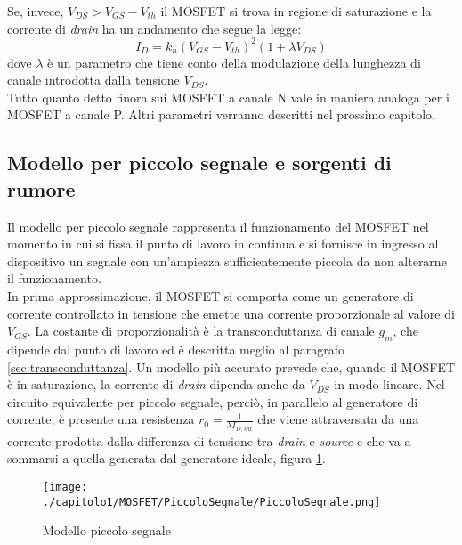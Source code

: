 Se, invece, $V_{DS} > V_{GS} -  V_{th}$ il MOSFET si trova in regione di saturazione e la corrente di \emph{drain} ha un andamento che segue la legge:\\
\begin{equation}
  I_D = k_n\left(V_{GS}-V_{th}\right)^2 (1+\lambda V_{DS})
\end{equation}
dove $\lambda$ è un parametro che tiene conto della modulazione della lunghezza di canale introdotta dalla tensione $V_{DS}$.\\

Tutto quanto detto finora sui MOSFET a canale N vale in maniera analoga per i MOSFET a canale P.
Altri parametri verranno descritti nel prossimo capitolo.

\subsection{Modello per piccolo segnale e sorgenti di rumore}
Il modello per piccolo segnale rappresenta il funzionamento del MOSFET nel momento in cui si fissa il punto di lavoro in continua e si fornisce in ingresso al dispositivo un segnale con un'ampiezza sufficientemente piccola da non alterarne il funzionamento. \\

In prima approssimazione, il MOSFET si comporta come un generatore di corrente controllato in tensione che emette una corrente proporzionale al valore di $V_{GS}$. La costante di proporzionalità è la transconduttanza di canale $g_m$, che dipende dal punto di lavoro ed è descritta meglio al paragrafo \ref{sec:transconduttanza}. Un modello più accurato prevede che, quando il MOSFET è in saturazione, la corrente di \emph{drain} dipenda anche da $V_{DS}$ in modo lineare. Nel circuito equivalente per piccolo segnale, perciò, in parallelo al generatore di corrente, è presente una resistenza $r_0 = \frac{1}{\lambda I_{D,sat}}$ che viene attraversata da una corrente prodotta dalla differenza di tensione tra \emph{drain} e \emph{source} e che va a sommarsi a quella generata dal generatore ideale, figura \ref{fig:piccolo_segnale}.

\begin{figure}[t]
  
  \centering
  \texttt{[image: ./capitolo1/MOSFET/PiccoloSegnale/PiccoloSegnale.png]}
  \caption[Modello piccolo segnale]{Modello piccolo segnale}
  \label{fig:piccolo_segnale}

\end{figure}

